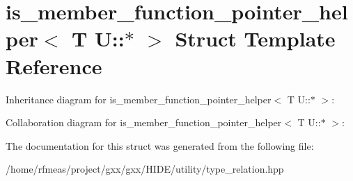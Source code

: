 \hypertarget{structis__member__function__pointer__helper_3_01T_01U_1_1_5_01_4}{}\section{is\+\_\+member\+\_\+function\+\_\+pointer\+\_\+helper$<$ T U\+:\+:$\ast$ $>$ Struct Template Reference}
\label{structis__member__function__pointer__helper_3_01T_01U_1_1_5_01_4}


Inheritance diagram for is\+\_\+member\+\_\+function\+\_\+pointer\+\_\+helper$<$ T U\+:\+:$\ast$ $>$\+:


Collaboration diagram for is\+\_\+member\+\_\+function\+\_\+pointer\+\_\+helper$<$ T U\+:\+:$\ast$ $>$\+:


The documentation for this struct was generated from the following file\+:\begin{DoxyCompactItemize}
\item 
/home/rfmeas/project/gxx/gxx/\+H\+I\+D\+E/utility/type\+\_\+relation.\+hpp\end{DoxyCompactItemize}
